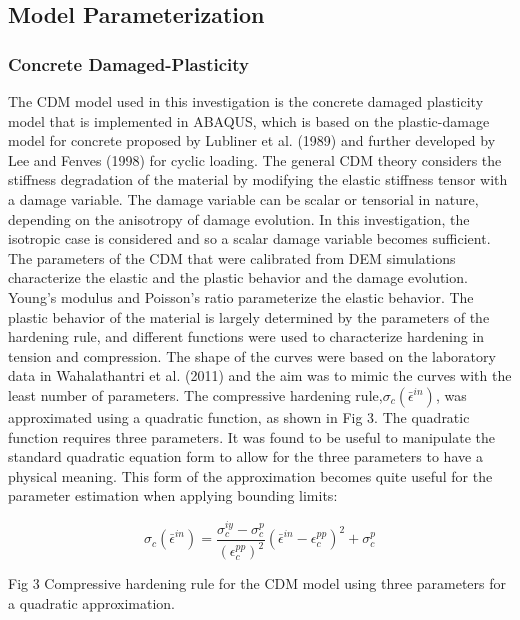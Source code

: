 \subsection{Model Parameterization}


\subsubsection{Concrete Damaged-Plasticity}

The CDM model used in this investigation is the concrete damaged plasticity
model that is implemented in ABAQUS, which is based on the plastic-damage
model for concrete proposed by Lubliner et al. (1989) and further
developed by Lee and Fenves (1998) for cyclic loading. The general
CDM theory considers the stiffness degradation of the material by
modifying the elastic stiffness tensor with a damage variable. The
damage variable can be scalar or tensorial in nature, depending on
the anisotropy of damage evolution. In this investigation, the isotropic
case is considered and so a scalar damage variable becomes sufficient.
The parameters of the CDM that were calibrated from DEM simulations
characterize the elastic and the plastic behavior and the damage evolution.
Young's modulus and Poisson's ratio parameterize the elastic behavior.
The plastic behavior of the material is largely determined by the
parameters of the hardening rule, and different functions were used
to characterize hardening in tension and compression. The shape of
the curves were based on the laboratory data in Wahalathantri et al.
(2011) and the aim was to mimic the curves with the least number of
parameters. The compressive hardening rule,$\sigma_{c}\left(\bar{\epsilon}^{in}\right)$,
was approximated using a quadratic function, as shown in Fig 3. The
quadratic function requires three parameters. It was found to be useful
to manipulate the standard quadratic equation form to allow for the
three parameters to have a physical meaning. This form of the approximation
becomes quite useful for the parameter estimation when applying bounding
limits:

\begin{equation}
\sigma_{c}\left(\bar{\epsilon}^{in}\right)=\frac{\sigma_{c}^{iy}-\sigma_{c}^{p}}{\left(\epsilon_{c}^{pp}\right)^{2}}\left(\bar{\epsilon}^{in}-\epsilon_{c}^{pp}\right)^{2}+\sigma_{c}^{p}\label{eqn:param2-1}
\end{equation}


Fig 3 Compressive hardening rule for the CDM model using three parameters
for a quadratic approximation. 

